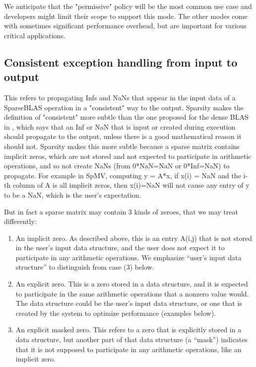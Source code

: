 \documentclass{article}
\begin{document}
We anticipate that the "permissive" policy will be the most common use case and developers might limit their scope to support this mode. The other modes come with sometimes significant performance overhead, but are important for various critical applications.

\fi

\subsection{Consistent exception handling from
input to output}

This refers to propagating Infs and NaNs that appear in the input data of a SparseBLAS
operation in a "consistent" way to the output. Sparsity makes the definition of "consistent"
more subtle than the one proposed for the dense BLAS in \cite{Proposed_BLAS_LAPACK_exception_handling}, which says that an Inf or NaN
that is input or created during execution should propagate to the output, unless there
is a good mathematical reason it should not. Sparsity makes this more subtle because
a sparse matrix contains implicit zeros, which are not stored and not expected to participate in
arithmetic operations, and so not create NaNs (from 0*NaN=NaN or 0*Inf=NaN) to
propagate. For example in SpMV, computing y = A*x, if x(i) = NaN and the i-th column
of A is all implicit zeros, then x(i)=NaN will not cause any entry of y to be a NaN, which
is the user's expectation. 

But in fact a sparse matrix may contain 3 kinds of zeroes, that we may treat differently:
\begin{enumerate}
\item An implicit zero. As described above, this is an entry A(i,j) that is not stored in the 
user's input data structure, and the user does not expect it to participate in any
arithmetic operations. We emphasize ``user's input data structure'' to distinguish
from case (3) below.
\item An explicit zero. This is a zero stored in a data structure, and it is
expected to participate in the same arithmetic operations that a nonzero value would.
The data structure could be the user's input data structure, or one that is created by
the system to optimize performance (examples below).
\item An explicit masked zero. This refers to a zero that is explicitly stored in a data structure,
but another part of that data structure (a ``mask'') indicates that it is not supposed to
participate in any arithmetic operations, like an implicit zero. 
\end{enumerate}
\end{document}
